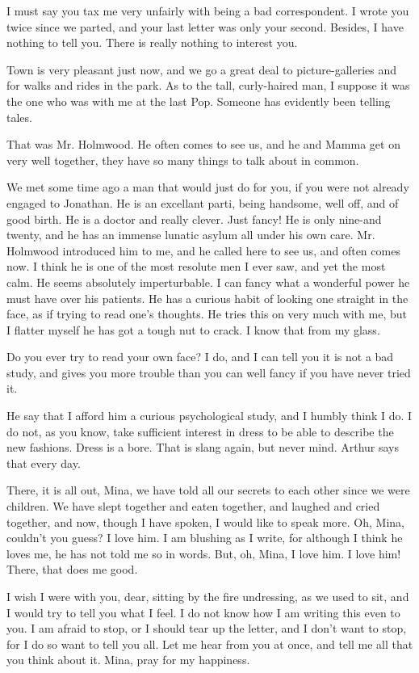 I must say you tax me very unfairly with being a bad correspondent. I wrote you twice since we parted, and your last letter was only your second. Besides, I have nothing to tell you. There is really nothing to interest you. 

Town is very pleasant just now, and we go a great deal to picture-galleries and for walks and rides in the park. As to the tall, curly-haired man, I suppose it was the one who was with me at the last Pop. Someone has evidently been telling tales. 

That was Mr. Holmwood. He often comes to see us, and he and Mamma get on very well together, they have so many things to talk about in common. 

We met some time ago a man that would just do for you, if you were not already engaged to Jonathan. He is an excellant parti, being handsome, well off, and of good birth. He is a doctor and really clever. Just fancy! He is only nine-and twenty, and he has an immense lunatic asylum all under his own care. Mr. Holmwood introduced him to me, and he called here to see us, and often comes now. I think he is one of the most resolute men I ever saw, and yet the most calm. He seems absolutely imperturbable. I can fancy what a wonderful power he must have over his patients. He has a curious habit of looking one straight in the face, as if trying to read one's thoughts. He tries this on very much with me, but I flatter myself he has got a tough nut to crack. I know that from my glass. 

Do you ever try to read your own face? I do, and I can tell you it is not a bad study, and gives you more trouble than you can well fancy if you have never tried it. 

He say that I afford him a curious psychological study, and I humbly think I do. I do not, as you know, take sufficient interest in dress to be able to describe the new fashions. Dress is a bore. That is slang again, but never mind. Arthur says that every day. 

There, it is all out, Mina, we have told all our secrets to each other since we were children. We have slept together and eaten together, and laughed and cried together, and now, though I have spoken, I would like to speak more. Oh, Mina, couldn't you guess? I love him. I am blushing as I write, for although I think he loves me, he has not told me so in words. But, oh, Mina, I love him. I love him! There, that does me good. 

I wish I were with you, dear, sitting by the fire undressing, as we used to sit, and I would try to tell you what I feel. I do not know how I am writing this even to you. I am afraid to stop, or I should tear up the letter, and I don't want to stop, for I do so want to tell you all. Let me hear from you at once, and tell me all that you think about it. Mina, pray for my happiness. 

